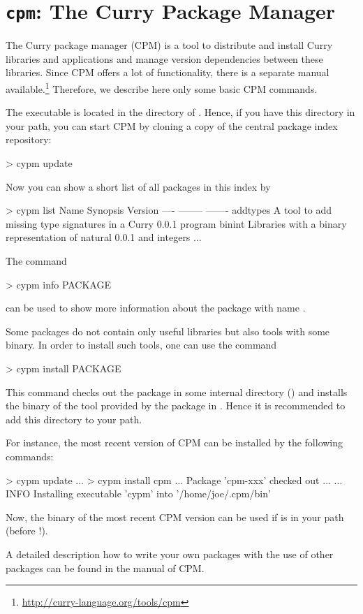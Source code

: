 \section{\texttt{cpm}: The Curry Package Manager}
\label{sec-cpm}

The Curry package manager (CPM) is a tool to
distribute and install Curry libraries and applications
and manage version dependencies between these libraries.
Since CPM offers a lot of functionality, there is a separate
manual available.\footnote{\url{http://curry-language.org/tools/cpm}}
Therefore, we describe here only some basic CPM commands.

The executable  is located in the  directory
of \CYS. Hence, if you have this directory in your path,
you can start CPM by cloning a copy of the central package index repository:
%
\begin{curry}
> cypm update
\end{curry}
%
Now you can show a short list of all packages in this index by
%
\begin{curry}
> cypm list
Name             Synopsis                                             Version   
----             --------                                             -------   
addtypes         A tool to add missing type signatures in a Curry     0.0.1     
                 program                                                        
binint           Libraries with a binary representation of natural    0.0.1     
                 and integers                                                   
$\ldots$
\end{curry}
%
The command
%
\begin{curry}
> cypm info PACKAGE
\end{curry}
%
can be used to show more information about the package with name
.

Some packages do not contain only useful libraries
but also tools with some binary. In order to install such tools,
one can use the command
%
\begin{curry}
> cypm install PACKAGE
\end{curry}
%
This command checks out the package in some internal directory
()
and installs the binary of the tool provided by the package
in .
Hence it is recommended to add this directory to your path.

For instance, the most recent version of CPM
can be installed by the following commands:
%
\begin{curry}
> cypm update
$\ldots$
> cypm install cpm
$\ldots$ Package 'cpm-xxx' checked out $\ldots$
$\ldots$
INFO  Installing executable 'cypm' into '/home/joe/.cpm/bin'
\end{curry}
%
Now, the binary  of the most recent CPM version can be used
if  is in your path
(before !).

A detailed description how to write your own packages
with the use of other packages can be found in the manual of CPM.

